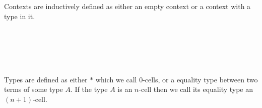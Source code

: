 \documentclass{sig-alternate}
\begin{document}
\begin{code}\>\<%
\\
\>  \<[19]%
\>[19]\AgdaSymbol{:} \<%
\\
\>  \AgdaSymbol{(} \AgdaSymbol{:} \AgdaSymbol{)} \<[19]%
\>[19]\AgdaSymbol{:} \<%
\\
\>  \<[19]%
\>[19]\AgdaSymbol{:} \AgdaSymbol{\{} \AgdaSymbol{:} \AgdaSymbol{\}(} \AgdaSymbol{:}  \AgdaSymbol{)}  \<%
\\
\>  \<[19]%
\>[19]\AgdaSymbol{:} \AgdaSymbol{\{} \AgdaSymbol{:} \AgdaSymbol{\}(} \AgdaSymbol{:}  \AgdaSymbol{)}  \<%
\\
\>  \<[19]%
\>[19]\AgdaSymbol{:}     \<%
\\
\>  \<[19]%
\>[19]\AgdaSymbol{:}   \<%
\\
\>\<\end{code}
Contexts are inductively defined as either an empty context or
a context with a type in it.

\begin{code}\>\<%
\\
\>  \<%
\\
\>[0]\<[2]%
\>[2] \<[8]%
\>[8]\AgdaSymbol{:} \<%
\\
\>[0]\<[2]%
\>[2]\AgdaInductiveConstructor{\_,\_} \<[8]%
\>[8]\AgdaSymbol{:} \AgdaSymbol{(} \AgdaSymbol{:} \AgdaSymbol{)(} \AgdaSymbol{:}  \AgdaSymbol{)}  \<%
\\
\>\<\end{code}
Types are defined as either $*$ which we
call 0-cells, or a equality type between two terms of some type $A$. If the
type $A$ is an $n$-cell then we call its equality type an $(n+1)$-cell.
\end{document}
